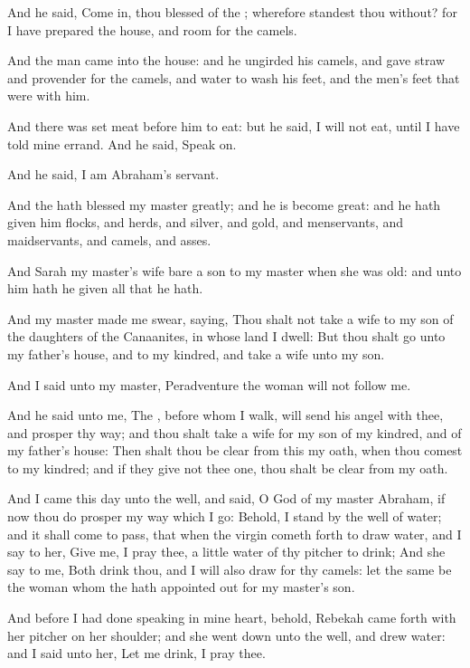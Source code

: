 \verse And he said, Come in, thou blessed of the \LORD; wherefore standest thou without? for I have prepared the house, and room for the camels.

\verse And the man came into the house: and he ungirded his camels, and gave straw and provender for the camels, and water to wash his feet, and the men's feet that were with him.

\verse And there was set meat before him to eat: but he said, I will not eat, until I have told mine errand. And he said, Speak on.

\verse And he said, I am Abraham's servant.

\verse And the \LORD hath blessed my master greatly; and he is become great: and he hath given him flocks, and herds, and silver, and gold, and menservants, and maidservants, and camels, and asses.

\verse And Sarah my master's wife bare a son to my master when she was old: and unto him hath he given all that he hath.

\verse And my master made me swear, saying, Thou shalt not take a wife to my son of the daughters of the Canaanites, in whose land I dwell: \verse But thou shalt go unto my father's house, and to my kindred, and take a wife unto my son.

\verse And I said unto my master, Peradventure the woman will not follow me.

\verse And he said unto me, The \LORD, before whom I walk, will send his angel with thee, and prosper thy way; and thou shalt take a wife for my son of my kindred, and of my father's house: \verse Then shalt thou be clear from this my oath, when thou comest to my kindred; and if they give not thee one, thou shalt be clear from my oath.

\verse And I came this day unto the well, and said, O \LORD God of my master Abraham, if now thou do prosper my way which I go: \verse Behold, I stand by the well of water; and it shall come to pass, that when the virgin cometh forth to draw water, and I say to her, Give me, I pray thee, a little water of thy pitcher to drink; \verse And she say to me, Both drink thou, and I will also draw for thy camels: let the same be the woman whom the \LORD hath appointed out for my master's son.

\verse And before I had done speaking in mine heart, behold, Rebekah came forth with her pitcher on her shoulder; and she went down unto the well, and drew water: and I said unto her, Let me drink, I pray thee.

